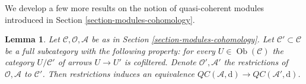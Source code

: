 \documentclass{stacks-project}
\theoremstyle{plain}
\newtheorem{lemma}[subsection]{Lemma}
\theoremstyle{definition}
\theoremstyle{remark}
\numberwithin{equation}{subsection}
\def\Ob{\mathop{\mathrm{Ob}}\nolimits}
\begin{document}
\noindent
We develop a few more results on the notion of quasi-coherent
modules introduced in Section \ref{section-modules-cohomology}.

\begin{lemma}
\label{lemma-cartesian-cofinal-subcategory}
Let $\mathcal{C}, \mathcal{O}, \mathcal{A}$ be as in
Section \ref{section-modules-cohomology}. Let
$\mathcal{C}' \subset \mathcal{C}$ be a full subcategory
with the following property: for every $U \in \Ob(\mathcal{C})$ the
category $U/\mathcal{C}'$ of arrows $U \to U'$ is cofiltered.
Denote $\mathcal{O}', \mathcal{A}'$ the restrictions
of $\mathcal{O}, \mathcal{A}$ to $\mathcal{C}'$.
Then restrictions induces an equivalence
$\mathit{QC}(\mathcal{A}, \text{d}) \to \mathit{QC}(\mathcal{A}', \text{d})$.
\end{lemma}
\end{document}
